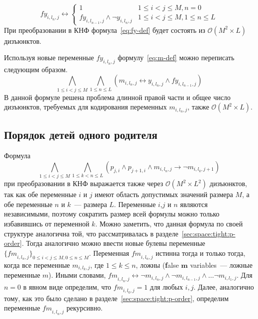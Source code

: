 \begin{equation}
\label{eq:fy-def}
  \mathit{fy}_{i,l_{n},j} \leftrightarrow 
    \begin{cases} 
      1                               & 1 \leq i < j \leq M, n = 0 \\
      \mathit{fy}_{i,l_{n - 1},j} \wedge \neg y_{i,l_{n},j}  & 1 \leq i < j \leq M, 1 \leq n \leq L
    \end{cases} 
\end{equation}
%
При преобразовании в КНФ формула~\eqref{eq:fy-def} будет состоять из $\mathcal{O}\left(M^{2} \times L\right)$ дизъюнктов.

Используя новые переменные $\mathit{fy}_{i,l_{n},j}$ формулу~\eqref{eq:m-def} можно переписать следующим образом.
%
\begin{equation}
\label{eq:m-def-tight}
  \bigwedge_{1 \leq i < j \leq M} \bigwedge_{1 \leq n \leq L} \left(m_{i,l_{n},j} \leftrightarrow y_{i,l_{n},j} \wedge \mathit{fy}_{i,l_{n - 1},j} \right)
\end{equation}
%
В данной формуле решена проблема длинной правой части и общее число дизъюнктов, требуемых для кодирования переменных $m_{i,l_{n},j}$, также $\mathcal{O}\left(M^{2} \times L\right)$. 


\subsection{Порядок детей одного родителя}
\label{sec:space:tight:m-order}

Формула
\begin{equation*}
\bigwedge_{1 \leq i < j \leq M} \bigwedge_{1 \leq k < n \leq L} \left(p_{j,i} \wedge p_{j + 1, i} \wedge m_{i,l_{n}, j} \rightarrow \neg m_{i, l_{k}, j + 1}\right)
\end{equation*}
при преобразовании в КНФ выражается также через $\mathcal{O}\left(M^{2} \times L^{2}\right)$ дизъюнктов, так как обе переменные $i$ и $j$ имеют область допустимых значений размера $M$, а обе переменные $n$ и $k$~{---} размера $L$.
Переменные $i$,$j$ и $n$ являются независимыми, поэтому сократить размер всей формулы можно только избавившись от переменной $k$.
Можно заметить, что данная формула по своей структуре аналогична той, что рассматривалась в разделе~\ref{sec:space:tight:p-order}.
Тогда аналогично можно ввести новые булевы переменные $\{\mathit{fm}_{i,l_{n},j}\}_{0 \leq i < j \leq M,0 \leq n \leq M}$.
Переменная $\mathit{fm}_{i,l_{n},j}$ истинна тогда и только тогда, когда все переменные $m_{i,l_{k},j}$, где $1 \leq k \leq n$, ложны (\textbf{f}alse $\boldsymbol{m}$ variables~{---} ложные переменные $m$).
Иными словами, $\mathit{fm}_{i,l_{n},j} \leftrightarrow \neg m_{i,l_{n},j} \wedge \neg m_{i, l_{n - 1}, j} \wedge \ldots \neg m_{i,l_{1},j}$. 
Для $n = 0$ в явном виде определим, что $\mathit{fm}_{i,l_{0},j} = 1$ для любых $i,j$.
Далее, аналогично тому, как это было сделано в разделе~\ref{sec:space:tight:p-order}, определим переменные $\mathit{fm}_{i,l_{n},j}$ рекурсивно.

